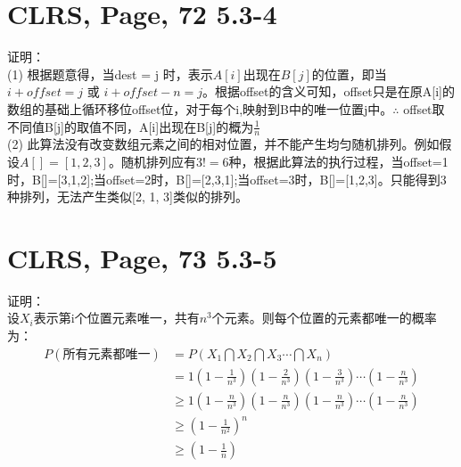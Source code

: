 \documentclass[UTF8]{ctexart}
\begin{document}
\section{CLRS, Page, 72 5.3-4}

证明：\\
(1) 根据题意得，当dest = j 时，表示$A[i]$出现在$B[j]$的位置，即当$i+offset = j$ 或 $i+offset-n = j$。根据offset的含义可知，offset只是在原A[i]的数组的基础上循环移位offset位，对于每个i,映射到B中的唯一位置j中。$\therefore$ offset取不同值B[j]的取值不同，A[i]出现在B[j]的概为$\frac{1}{n}$ \\
(2) 此算法没有改变数组元素之间的相对位置，并不能产生均匀随机排列。例如假设$A[]={[1,2,3]}$。随机排列应有$3!=6$种，根据此算法的执行过程，当offset=1时，B[]=[3,1,2];当offset=2时，B[]=[2,3,1];当offset=3时，B[]=[1,2,3]。只能得到3种排列，无法产生类似[2, 1, 3]类似的排列。


\section{CLRS, Page, 73 5.3-5}

证明： \\
设$X_i$表示第i个位置元素唯一，共有$n^3$个元素。则每个位置的元素都唯一的概率为：
\begin{align*}
    P(\text{所有元素都唯一}) &= P(X_1\bigcap X_2\bigcap X_3 \cdots \bigcap X_n) \\
        &= 1(1-\frac{1}{n^3})(1-\frac{2}{n^3})(1-\frac{3}{n^3})\cdots(1-\frac{n}{n^3})\\
        &\geq 1(1-\frac{n}{n^3})(1-\frac{n}{n^3})(1-\frac{n}{n^3})\cdots(1-\frac{n}{n^3})\\
        &\geq (1-\frac{1}{n^2})^n\\
        &\geq (1-\frac{1}{n})
\end{align*}
\end{document}
